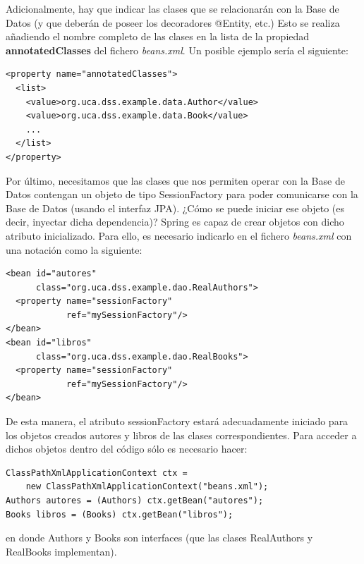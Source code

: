 \documentclass[11pt]{article}
\begin{document}
Adicionalmente, hay que indicar las clases que se relacionarán con la Base de
Datos (y que deberán de poseer los decoradores @Entity, etc.) Esto se
realiza añadiendo el nombre completo de las clases en la lista de la propiedad
\textbf{annotatedClasses} del fichero \emph{beans.xml}. Un posible ejemplo sería
el siguiente:


\begin{lstlisting}
<property name="annotatedClasses">
  <list>
    <value>org.uca.dss.example.data.Author</value>
    <value>org.uca.dss.example.data.Book</value>
    ...
  </list>
</property>
\end{lstlisting}

Por último, necesitamos que las clases que nos permiten operar con la Base de
Datos contengan un objeto de tipo \textsf{SessionFactory} para poder comunicarse
con la Base de Datos (usando el interfaz JPA). ¿Cómo se puede iniciar ese
objeto (es decir, inyectar dicha dependencia)? Spring es capaz de crear objetos con dicho atributo inicializado. Para ello, es necesario indicarlo en el fichero \emph{beans.xml} con una notación
como la siguiente:


\begin{lstlisting}
<bean id="autores"
      class="org.uca.dss.example.dao.RealAuthors">
  <property name="sessionFactory"
            ref="mySessionFactory"/>
</bean>
<bean id="libros"
      class="org.uca.dss.example.dao.RealBooks">
  <property name="sessionFactory"
            ref="mySessionFactory"/>
</bean> \end{lstlisting}

De esta manera, el atributo \textsf{sessionFactory} estará adecuadamente
iniciado para los objetos creados autores y libros de las clases
correspondientes. Para acceder a dichos objetos dentro del código sólo es
necesario hacer:

\lstset{language=java}

\begin{lstlisting}
ClassPathXmlApplicationContext ctx =
    new ClassPathXmlApplicationContext("beans.xml");
Authors autores = (Authors) ctx.getBean("autores");
Books libros = (Books) ctx.getBean("libros");
\end{lstlisting}

en donde \textsf{Authors} y \textsf{Books} son interfaces (que las clases \textsf{RealAuthors} y \textsf{RealBooks} implementan).
\end{document}
